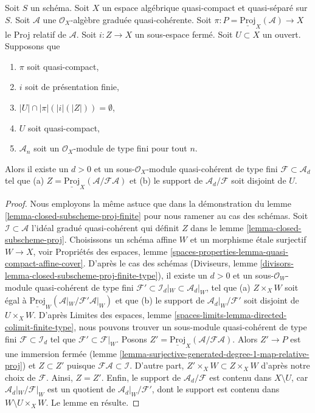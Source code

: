 \begin{lemma}
\label{lemma-closed-subscheme-proj-finite-type}
Soit $S$ un schéma. Soit $X$ un espace algébrique quasi-compact et quasi-séparé
sur $S$.
Soit $\mathcal{A}$ une $\mathcal{O}_X$-algèbre graduée quasi-cohérente.
Soit $\pi : P = \underline{\text{Proj}}_X(\mathcal{A}) \to X$ le Proj relatif
de $\mathcal{A}$. Soit $i : Z \to X$ un sous-espace fermé.
Soit $U \subset X$ un ouvert. Supposons que
\begin{enumerate}
\item $\pi$ soit quasi-compact,
\item $i$ soit de présentation finie,
\item $|U| \cap |\pi|(|i|(|Z|)) = \emptyset$,
\item $U$ soit quasi-compact,
\item $\mathcal{A}_n$ soit un $\mathcal{O}_X$-module de type fini pour tout $n$.
\end{enumerate}
Alors il existe un $d > 0$ et un
sous-$\mathcal{O}_X$-module quasi-cohérent de type fini $\mathcal{F} \subset \mathcal{A}_d$ tel que (a)
$Z = \underline{\text{Proj}}_X(\mathcal{A}/\mathcal{F}\mathcal{A})$
et (b) le support de $\mathcal{A}_d/\mathcal{F}$ soit disjoint de $U$.
\end{lemma}

\begin{proof}
Nous employons la même astuce que dans la démonstration du
lemme \ref{lemma-closed-subscheme-proj-finite}
pour nous ramener au cas des schémas.
Soit $\mathcal{I} \subset \mathcal{A}$ l'idéal gradué quasi-cohérent
qui définit $Z$ dans le lemme \ref{lemma-closed-subscheme-proj}.
Choisissons un schéma affine $W$ et un morphisme \'etale surjectif
$W \to X$, voir Propriétés des espaces, lemme
\ref{spaces-properties-lemma-quasi-compact-affine-cover}.
D'après le cas des schémas
(Diviseurs, lemme \ref{divisors-lemma-closed-subscheme-proj-finite-type}),
il existe un $d > 0$ et un
sous-$\mathcal{O}_W$-module quasi-cohérent de type fini
$\mathcal{F}' \subset \mathcal{I}_d|_W \subset \mathcal{A}_d|_W$,
tel que (a) $Z \times_X W$ soit égal à
$\underline{\text{Proj}}_W(\mathcal{A}|_W/\mathcal{F}'\mathcal{A}|_W)$
et que (b) le support de $\mathcal{A}_d|_W/\mathcal{F}'$ soit disjoint de
$U \times_X W$. D'après Limites des espaces, lemme
\ref{spaces-limits-lemma-directed-colimit-finite-type},
nous pouvons trouver un sous-module quasi-cohérent de type fini
$\mathcal{F} \subset \mathcal{I}_d$ tel que
$\mathcal{F}' \subset \mathcal{F}|_W$. Posons
$Z' = \underline{\text{Proj}}_X(\mathcal{A}/\mathcal{F}\mathcal{A})$.
Alors $Z' \to P$ est une immersion fermée
(lemme \ref{lemma-surjective-generated-degree-1-map-relative-proj})
et $Z \subset Z'$ puisque $\mathcal{F}\mathcal{A} \subset \mathcal{I}$.
D'autre part, $Z' \times_X W \subset Z \times_X W$ d'après notre
choix de $\mathcal{F}$. Ainsi, $Z = Z'$.
Enfin, le support de $\mathcal{A}_d/\mathcal{F}$ est contenu dans
$X \setminus U$, car $\mathcal{A}_d|_W/\mathcal{F}|_W$ est un quotient
de $\mathcal{A}_d|_W/\mathcal{F}'$, dont le support est contenu dans
$W \setminus U \times_X W$. Le lemme en résulte.
\end{proof}

